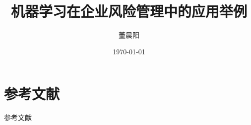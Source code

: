 \documentclass[mathserif,envcountsect,fontset=mac]{ctexbeamer}
\author{董晨阳}
\date{\today}
\title{机器学习在企业风险管理中的应用举例}
\begin{document}



\section{参考文献}
\begin{frame}[allowframebreaks]{参考文献}
    \nocite{*}
    \printbibliography
\end{frame}
\end{document}
